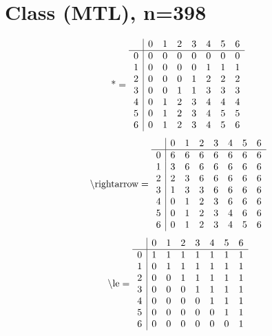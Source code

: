 \documentclass[11pt]{article}
\begin{document}
\section{Class (MTL), n=398}
\[\text{*} = 
\begin{array}{r | r r r r r r r}
 & 0 & 1 & 2 & 3 & 4 & 5 & 6 \\ \hline
0 & 0 & 0 & 0 & 0 & 0 & 0 & 0 \\
1 & 0 & 0 & 0 & 0 & 1 & 1 & 1 \\
2 & 0 & 0 & 0 & 1 & 2 & 2 & 2 \\
3 & 0 & 0 & 1 & 1 & 3 & 3 & 3 \\
4 & 0 & 1 & 2 & 3 & 4 & 4 & 4 \\
5 & 0 & 1 & 2 & 3 & 4 & 5 & 5 \\
6 & 0 & 1 & 2 & 3 & 4 & 5 & 6 \\
\end{array}
\]
\[\text{\textbackslash rightarrow} = 
\begin{array}{r | r r r r r r r}
 & 0 & 1 & 2 & 3 & 4 & 5 & 6 \\ \hline
0 & 6 & 6 & 6 & 6 & 6 & 6 & 6 \\
1 & 3 & 6 & 6 & 6 & 6 & 6 & 6 \\
2 & 2 & 3 & 6 & 6 & 6 & 6 & 6 \\
3 & 1 & 3 & 3 & 6 & 6 & 6 & 6 \\
4 & 0 & 1 & 2 & 3 & 6 & 6 & 6 \\
5 & 0 & 1 & 2 & 3 & 4 & 6 & 6 \\
6 & 0 & 1 & 2 & 3 & 4 & 5 & 6 \\
\end{array}
\]
\[\text{\textbackslash le} = 
\begin{array}{r | r r r r r r r}
 & 0 & 1 & 2 & 3 & 4 & 5 & 6 \\ \hline
0 & 1 & 1 & 1 & 1 & 1 & 1 & 1 \\
1 & 0 & 1 & 1 & 1 & 1 & 1 & 1 \\
2 & 0 & 0 & 1 & 1 & 1 & 1 & 1 \\
3 & 0 & 0 & 0 & 1 & 1 & 1 & 1 \\
4 & 0 & 0 & 0 & 0 & 1 & 1 & 1 \\
5 & 0 & 0 & 0 & 0 & 0 & 1 & 1 \\
6 & 0 & 0 & 0 & 0 & 0 & 0 & 1 \\
\end{array}
\]
\end{document}
